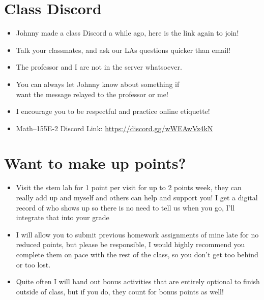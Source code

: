 \documentclass{article}
\begin{document}
\section*{Class Discord}
\begin{itemize}
    \item Johnny made a class Discord a while ago, here 
    is the link again to join! 

    \item Talk your classmates, and 
    ask our LAs questions quicker than email! 
    
    \item The professor and I are not in the server whatsoever.
    
    \item You can always let Johnny know about something if  \\
    want the message relayed to the professor or me!

    \item I encourage you to be respectful and practice online etiquette!
    
    \item Math–155E-2 Discord Link: \url{https://discord.gg/wWEAwVz4kN}
\end{itemize}

\vspace{1.5cm}
\section*{Want to make up points?}
\begin{itemize}
    \item Visit the stem lab for 1 point per visit for up to 2 points 
    week, they can really add up and myself and others can help and 
    support you! I get a digital record of who shows up so there is 
    no need to tell us when you go, I’ll integrate that into your grade

    \item I will allow you to submit previous homework assignments of 
    mine late for no reduced points, but please be responsible, I would 
    highly recommend you complete them on pace with the rest of 
    the class, so you don’t get too behind or too lost.  

    \item Quite often I will hand out bonus activities that are entirely 
    optional to finish outside of class, but if you do, 
    they count for bonus points as well!
\end{itemize}
\end{document}
